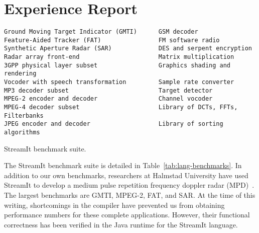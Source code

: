 \section{Experience Report}
\label{sec:lang-experience}

\begin{table}[t]
\centering
{\small
\begin{verbatim}
Ground Moving Target Indicator (GMTI)      GSM decoder                       
Feature-Aided Tracker (FAT)                FM software radio                 
Synthetic Aperture Radar (SAR)             DES and serpent encryption        
Radar array front-end                      Matrix multiplication             
3GPP physical layer subset                 Graphics shading and rendering    
Vocoder with speech transformation         Sample rate converter             
MP3 decoder subset                         Target detector                   
MPEG-2 encoder and decoder                 Channel vocoder                   
MPEG-4 decoder subset                      Library of DCTs, FFTs, Filterbanks
JPEG encoder and decoder                   Library of sorting algorithms     
\end{verbatim}}
\caption{StreamIt benchmark suite.\protect\label{tab:lang-benchmarks}}
\end{table}


The StreamIt benchmark suite is detailed in
Table~\ref{tab:lang-benchmarks}.  In addition to our own benchmarks,
researchers at Halmstad University have used StreamIt to develop a
medium pulse repetition frequency doppler radar
(MPD)~\cite{ola-techrep}.  The largest benchmarks are GMTI, MPEG-2,
FAT, and SAR.  At the time of this writing, shortcomings in the
compiler have prevented us from obtaining performance numbers for
these complete applications.  However, their functional correctness
has been verified in the Java runtime for the StreamIt language.

